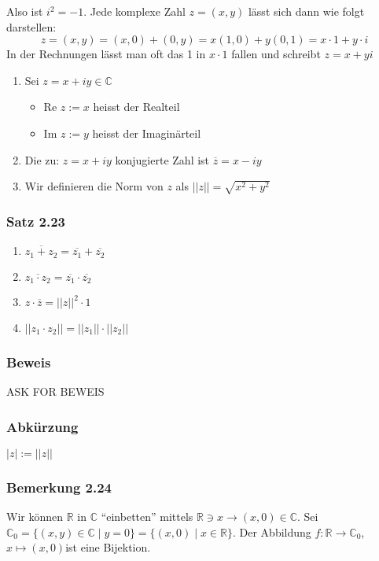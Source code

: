 Also ist $i^2=-1$. Jede komplexe Zahl $z=(x,y)$ lässt sich dann wie folgt darstellen:  \[z=(x,y)=(x,0)+(0,y)=x(1,0)+y(0,1)=x\cdot 1+ y\cdot i\]
In der Rechnungen lässt man oft das 1 in $x\cdot 1$ fallen und schreibt $z=x+yi$
\begin{definition}{2.22}
\begin{enumerate}
\item Sei $z=x+iy\in\mathbb{C}$
\begin{itemize}
\item Re $z:=x$ heisst der Realteil
\item Im $z:=y$ heisst der Imaginärteil 
\end{itemize}
\item Die zu: $z=x+iy$ konjugierte Zahl ist $\overline{z}=x-iy$
\item Wir definieren die Norm von $z$ als $\left|\left| z\right|\right|=\sqrt{x^2+y^2}$
\end{enumerate}
\end{definition}
\subsubsection*{Satz 2.23}
\begin{enumerate}[\indent (i)]
\item $\overline{z_1+z_2}=\overline{z_1}+\overline{z_2}$
\item $\overline{z_1\cdot z_2}=\overline{z_1}\cdot\overline{z_2}$
\item $z\cdot\overline{z}={\left|\left| z\right|\right|}^2\cdot 1$
\item ${\left|\left| z_1\cdot z_2\right|\right|}={\left|\left| z_1\right|\right|}\cdot{\left|\left| z_2\right|\right|}$
\end{enumerate}
\subsubsection*{Beweis}
ASK FOR BEWEIS 
\subsubsection*{Abkürzung}
$\left| z\right| := \left|\left| z \right|\right|$
\subsubsection*{Bemerkung 2.24}
Wir können $\mathbb{R}$ in $\mathbb{C}$ ``einbetten'' mittels $\mathbb{R}\ni x\to (x,0)\in\mathbb{C}$. Sei $\mathbb{C}_0=\{ (x,y)\in\mathbb{C}\mid y=0 \}=\{ (x,0)\mid x\in\mathbb{R}\}$. Der Abbildung $f:\mathbb{R}\to\mathbb{C}_0$, $x\mapsto (x,0)$ist eine Bijektion.\\

